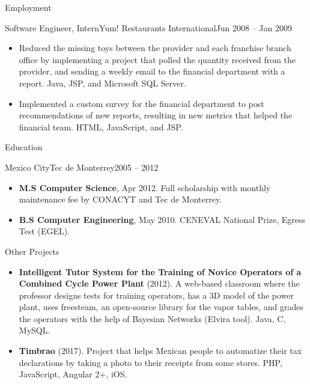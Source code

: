 \documentclass[calibri]{../macdowell-cv/mcdowellcv}
\begin{document}
\begin{cvsection}{Employment}
		\pagebreak

		\begin{cvsubsection}{Software Engineer, Intern}{Yum! Restaurants International}{Jun 2008 -- Jan 2009}
			\begin{itemize}
				\item Reduced the missing toys between the provider and each franchise branch office by implementing a project that polled the quantity received from the provider, and sending a weekly email to the financial department with a report. Java, JSP, and Microsoft SQL Server.
				\item Implemented a custom survey for the financial department to post recommendations of new reports, resulting in new metrics that helped the financial team. HTML, JavaScript, and JSP.
			\end{itemize}
		\end{cvsubsection}
	\end{cvsection}

	\begin{cvsection}{Education}
		\begin{cvsubsection}{Mexico City}{Tec de Monterrey}{2005 -- 2012}
			\begin{itemize}
				\item \textbf{M.S Computer Science}, Apr 2012. Full scholarship with monthly maintenance fee by CONACYT and Tec de Monterrey.
				\item \textbf{B.S Computer Engineering}, May 2010. CENEVAL National Prize, Egress Test (EGEL).
			\end{itemize}
		\end{cvsubsection}
	\end{cvsection}
	
	\begin{cvsection}{Other Projects}
		\begin{cvsubsection}{}{}{}	
			\begin{itemize}
				\item \textbf{Intelligent Tutor System for the Training of Novice Operators of a Combined Cycle Power Plant} (2012). A web-based classroom where the professor designs tests for training operators, has a 3D model of the power plant, uses freesteam, an open-source library for the vapor tables, and grades the operators with the help of Bayesian Networks (Elvira tool). Java, C, MySQL.
				\item \textbf{Timbrao} (2017). Project that helps Mexican people to automatize their tax declarations by taking a photo to their receipts from some stores. PHP, JavaScript, Angular 2+, iOS.
			\end{itemize}
		\end{cvsubsection}
	\end{cvsection}
	
\end{document}
